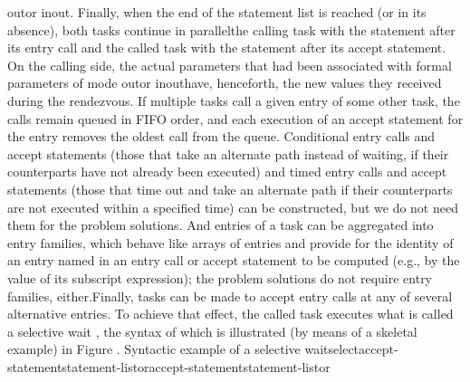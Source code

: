 \tyxffmxmono[]\tyxtstxbf[]out\tyxtstxendbf[]\tyxffmxendmono[] or %
\tyxffmxmono[]\tyxtstxbf[]in\tyxtstxendbf[]\tyxffmxendmono[] %
\tyxffmxmono[]\tyxtstxbf[]out\tyxtstxendbf[]\tyxffmxendmono[]. Finally,
when the end of the statement list is reached (or in its absence),
both tasks continue in parallel\EmDash[]the calling task with the
statement after its entry call and the called task with the statement
after its accept statement. On the calling side, the actual parameters
that had been associated with formal parameters of mode %
\tyxffmxmono[]\tyxtstxbf[]out\tyxtstxendbf[]\tyxffmxendmono[] or %
\tyxffmxmono[]\tyxtstxbf[]in\tyxtstxendbf[]\tyxffmxendmono[] %
\tyxffmxmono[]\tyxtstxbf[]out\tyxtstxendbf[]\tyxffmxendmono[] have,
henceforth, the new values they received during the rendezvous.%
\Endpara[]
\Para[]If multiple tasks call a given entry of some other task, the
calls remain queued in FIFO order, and each execution of an accept
statement for the entry removes the oldest call from the queue.%
\Endpara[]
\Para[]Conditional entry calls and accept statements (those that take
an alternate path instead of waiting, if their counterparts have not
already been executed) and timed entry calls and accept statements
(those that time out and take an alternate path if their counterparts
are not executed within a specified time) can be constructed, but
we do not need them for the problem solutions. And entries of a task
can be aggregated into \txtxemph[]entry families\txtxendemph[], which
behave like arrays of entries and provide for the identity of an entry
named in an entry call or accept statement to be computed (e.g., by
the value of its subscript expression); the problem solutions do not
require entry families, either.\Endpara[]
\Para[]Finally, tasks can be made to accept entry calls at any of
several alternative entries. To achieve that effect, the called task
executes what is called a \txtxemph[]selective wait%
\txtxendemph[], the syntax of which is illustrated (by means of a
skeletal example) in Figure .
\Parbox[]
Syntactic example of
a selective wait\FgEndcap[]
\Comp[]\tyxtstxbf[]select\tyxtstxendbf[]
   \Symlt[]\tyxtstxit[]accept-statement\tyxtstxendit[]\Symgt[]
   \Symlbk[]\Symlt[]\tyxtstxit[]statement-list\tyxtstxendit[]\Symgt[]\Symrbk[]
\tyxtstxbf[]or\tyxtstxendbf[]
   \Symlt[]\tyxtstxit[]accept-statement\tyxtstxendit[]\Symgt[]
   \Symlbk[]\Symlt[]\tyxtstxit[]statement-list\tyxtstxendit[]\Symgt[]\Symrbk[]
\tyxtstxbf[]or\tyxtstxendbf[]
